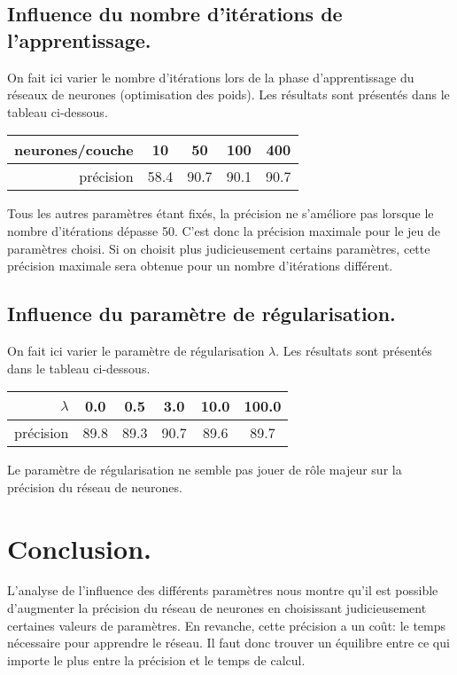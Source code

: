 \documentclass[a4paper, 12pt]{article}
\begin{document}
\subsection{Influence du nombre d'itérations de l'apprentissage.}
On fait ici varier le nombre d'itérations lors de la phase d'apprentissage du réseaux de neurones (optimisation des poids).
Les résultats sont présentés dans le tableau ci-dessous.
\begin{center}
    \begin{tabular}{|r|c|c|c|c|}
        \hline
        neurones/couche & 10 & 50 & 100 & 400 \\
        \hline
        précision & \num{58.4} & \num{90.7} & \num{90.1} & \num{90.7} \\
        \hline
    \end{tabular}
\end{center}
Tous les autres paramètres étant fixés, la précision ne s'améliore pas lorsque le nombre d'itérations dépasse 50.
C'est donc la précision maximale pour le jeu de paramètres choisi.
Si on choisit plus judicieusement certains paramètres, cette précision maximale sera obtenue pour un nombre d'itérations différent.

\subsection{Influence du paramètre de régularisation.}
On fait ici varier le paramètre de régularisation $\lambda$.
Les résultats sont présentés dans le tableau ci-dessous.
\begin{center}
    \begin{tabular}{|r|c|c|c|c|c|}
        \hline
        $\lambda$ & \num{0.0} & \num{0.5} & \num{3.0} & \num{10.0} & \num{100.0} \\
        \hline
        précision & \num{89.8} & \num{89.3} & \num{90.7} & \num{89.6} & \num{89.7} \\
        \hline
    \end{tabular}
\end{center}
Le paramètre de régularisation ne semble pas jouer de rôle majeur sur la précision du réseau de neurones.

\section{Conclusion.}
L'analyse de l'influence des différents paramètres nous montre qu'il est possible d'augmenter la précision du réseau de neurones en choisissant judicieusement certaines valeurs de paramètres.
En revanche, cette précision a un coût: le temps nécessaire pour apprendre le réseau.
Il faut donc trouver un équilibre entre ce qui importe le plus entre la précision et le temps de calcul.
\end{document}
